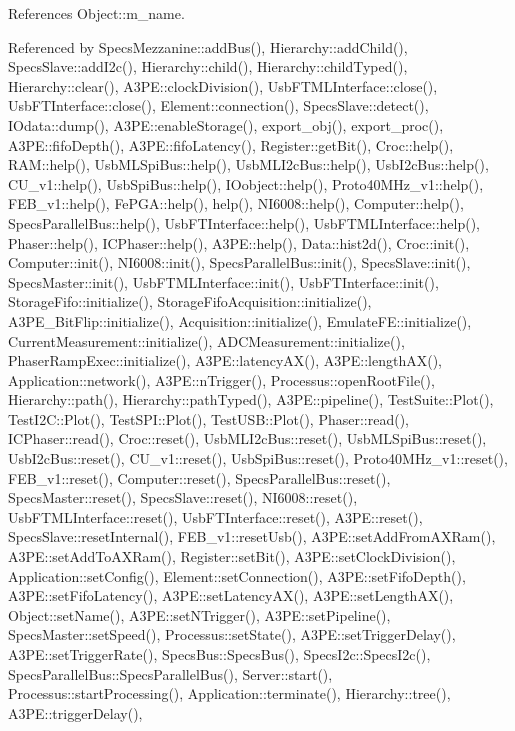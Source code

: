 References Object\+::m\+\_\+name.



Referenced by Specs\+Mezzanine\+::add\+Bus(), Hierarchy\+::add\+Child(), Specs\+Slave\+::add\+I2c(), Hierarchy\+::child(), Hierarchy\+::child\+Typed(), Hierarchy\+::clear(), A3\+P\+E\+::clock\+Division(), Usb\+F\+T\+M\+L\+Interface\+::close(), Usb\+F\+T\+Interface\+::close(), Element\+::connection(), Specs\+Slave\+::detect(), I\+Odata\+::dump(), A3\+P\+E\+::enable\+Storage(), export\+\_\+obj(), export\+\_\+proc(), A3\+P\+E\+::fifo\+Depth(), A3\+P\+E\+::fifo\+Latency(), Register\+::get\+Bit(), Croc\+::help(), R\+A\+M\+::help(), Usb\+M\+L\+Spi\+Bus\+::help(), Usb\+M\+L\+I2c\+Bus\+::help(), Usb\+I2c\+Bus\+::help(), C\+U\+\_\+v1\+::help(), Usb\+Spi\+Bus\+::help(), I\+Oobject\+::help(), Proto40\+M\+Hz\+\_\+v1\+::help(), F\+E\+B\+\_\+v1\+::help(), Fe\+P\+G\+A\+::help(), help(), N\+I6008\+::help(), Computer\+::help(), Specs\+Parallel\+Bus\+::help(), Usb\+F\+T\+Interface\+::help(), Usb\+F\+T\+M\+L\+Interface\+::help(), Phaser\+::help(), I\+C\+Phaser\+::help(), A3\+P\+E\+::help(), Data\+::hist2d(), Croc\+::init(), Computer\+::init(), N\+I6008\+::init(), Specs\+Parallel\+Bus\+::init(), Specs\+Slave\+::init(), Specs\+Master\+::init(), Usb\+F\+T\+M\+L\+Interface\+::init(), Usb\+F\+T\+Interface\+::init(), Storage\+Fifo\+::initialize(), Storage\+Fifo\+Acquisition\+::initialize(), A3\+P\+E\+\_\+\+Bit\+Flip\+::initialize(), Acquisition\+::initialize(), Emulate\+F\+E\+::initialize(), Current\+Measurement\+::initialize(), A\+D\+C\+Measurement\+::initialize(), Phaser\+Ramp\+Exec\+::initialize(), A3\+P\+E\+::latency\+A\+X(), A3\+P\+E\+::length\+A\+X(), Application\+::network(), A3\+P\+E\+::n\+Trigger(), Processus\+::open\+Root\+File(), Hierarchy\+::path(), Hierarchy\+::path\+Typed(), A3\+P\+E\+::pipeline(), Test\+Suite\+::\+Plot(), Test\+I2\+C\+::\+Plot(), Test\+S\+P\+I\+::\+Plot(), Test\+U\+S\+B\+::\+Plot(), Phaser\+::read(), I\+C\+Phaser\+::read(), Croc\+::reset(), Usb\+M\+L\+I2c\+Bus\+::reset(), Usb\+M\+L\+Spi\+Bus\+::reset(), Usb\+I2c\+Bus\+::reset(), C\+U\+\_\+v1\+::reset(), Usb\+Spi\+Bus\+::reset(), Proto40\+M\+Hz\+\_\+v1\+::reset(), F\+E\+B\+\_\+v1\+::reset(), Computer\+::reset(), Specs\+Parallel\+Bus\+::reset(), Specs\+Master\+::reset(), Specs\+Slave\+::reset(), N\+I6008\+::reset(), Usb\+F\+T\+M\+L\+Interface\+::reset(), Usb\+F\+T\+Interface\+::reset(), A3\+P\+E\+::reset(), Specs\+Slave\+::reset\+Internal(), F\+E\+B\+\_\+v1\+::reset\+Usb(), A3\+P\+E\+::set\+Add\+From\+A\+X\+Ram(), A3\+P\+E\+::set\+Add\+To\+A\+X\+Ram(), Register\+::set\+Bit(), A3\+P\+E\+::set\+Clock\+Division(), Application\+::set\+Config(), Element\+::set\+Connection(), A3\+P\+E\+::set\+Fifo\+Depth(), A3\+P\+E\+::set\+Fifo\+Latency(), A3\+P\+E\+::set\+Latency\+A\+X(), A3\+P\+E\+::set\+Length\+A\+X(), Object\+::set\+Name(), A3\+P\+E\+::set\+N\+Trigger(), A3\+P\+E\+::set\+Pipeline(), Specs\+Master\+::set\+Speed(), Processus\+::set\+State(), A3\+P\+E\+::set\+Trigger\+Delay(), A3\+P\+E\+::set\+Trigger\+Rate(), Specs\+Bus\+::\+Specs\+Bus(), Specs\+I2c\+::\+Specs\+I2c(), Specs\+Parallel\+Bus\+::\+Specs\+Parallel\+Bus(), Server\+::start(), Processus\+::start\+Processing(), Application\+::terminate(), Hierarchy\+::tree(), A3\+P\+E\+::trigger\+Delay(), 